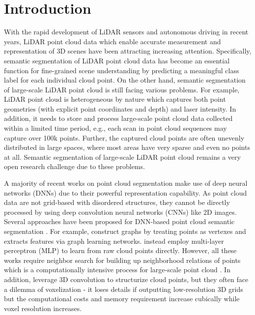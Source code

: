 \documentclass[preprint,review,3p]{elsarticle}
\begin{document}
\section{Introduction}\label{INTRODUCTION}

With the rapid development of LiDAR sensors and autonomous driving in recent years, LiDAR point cloud data which enable accurate measurement and representation of 3D scenes have been attracting increasing attention. Specifically, semantic segmentation of LiDAR point cloud data has become an essential function for fine-grained scene understanding by predicting a meaningful class label for each individual cloud point. On the other hand, semantic segmentation of large-scale LiDAR point cloud is still facing various problems. For example, LiDAR point cloud is heterogeneous by nature which captures both point geometries (with explicit point coordinates and depth) and laser intensity. In addition, it needs to store and process large-scale point cloud data collected within a limited time period, e.g., each scan in point cloud sequences may capture over 100k points. Further, the captured cloud points are often unevenly distributed in large spaces, where most areas have very sparse and even no points at all. Semantic segmentation of large-scale LiDAR point cloud remains a very open research challenge due to these problems.

A majority of recent works on point cloud segmentation make use of deep neural networks (DNNs) due to their powerful representation capability. As point cloud data are not grid-based with disordered structures, they cannot be directly processed by using deep convolution neural networks (CNNs) like 2D images. Several approaches have been proposed for DNN-based point cloud semantic segmentation \cite{guo2020deep}. For example, \cite{simonovsky2017dynamic,wang2019dynamic,bruna2013spectral} construct graphs by treating points as vertexes and extracts features via graph learning networks. \cite{qi2017pointnet,qi2017pointnet++,landrieu2018spg,tatarchenko2018tangent,hu2020randla} instead employ multi-layer perceptron (MLP) to learn from raw cloud points directly. However, all these works require neighbor search for building up neighborhood relations of points which is a computationally intensive process for large-scale point cloud \cite{liu2019point}. In addition, \cite{huang2016point,tchapmi2017segcloud,rethage2018fully} leverage 3D convolution to structurize cloud points, but they often face a dilemma of voxelization - it loses details if outputting low-resolution 3D grids but the computational costs and memory requirement increase cubically while voxel resolution increases.
\end{document}
